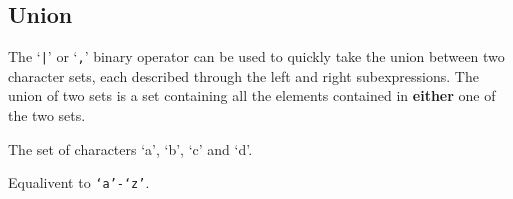 
\subsection{Union}
{
	The `\texttt{|}' or `\texttt{,}' binary operator can be used to
	quickly take the union between two character sets, each described through
	the left and right subexpressions. The union of two sets is
	a set containing all the elements contained in \textbf{either} one of the
	two sets.
	
	\begin{itemize}
	{
		\item[\texttt{`a', `b', `c', `d'}]
			The set of characters `a', `b', `c' and `d'.
		
		\item[\texttt{`a'-`o' | `m'-`z'}]
			Equalivent to \texttt{`a'-`z'}.
	}
	\end{itemize}
}
